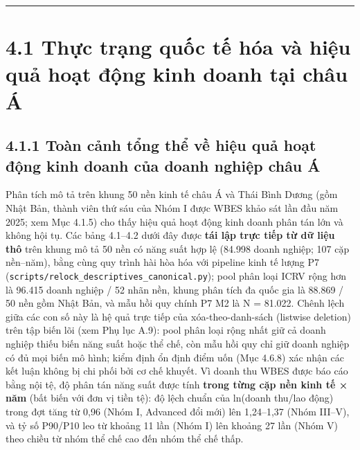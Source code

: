 \documentclass[
  a4paper,
  13pt]{extreport}
\begin{document}
\begin{center}\rule{0.5\linewidth}{0.5pt}\end{center}

\hypertarget{thux1ef1c-trux1ea1ng-quux1ed1c-tux1ebf-huxf3a-vuxe0-hiux1ec7u-quux1ea3-houx1ea1t-ux111ux1ed9ng-kinh-doanh-tux1ea1i-chuxe2u-uxe1}{%
\section{4.1 Thực trạng quốc tế hóa và hiệu quả hoạt động kinh doanh tại
châu
Á}\label{thux1ef1c-trux1ea1ng-quux1ed1c-tux1ebf-huxf3a-vuxe0-hiux1ec7u-quux1ea3-houx1ea1t-ux111ux1ed9ng-kinh-doanh-tux1ea1i-chuxe2u-uxe1}}

\hypertarget{touxe0n-cux1ea3nh-tux1ed5ng-thux1ec3-vux1ec1-hiux1ec7u-quux1ea3-houx1ea1t-ux111ux1ed9ng-kinh-doanh-cux1ee7a-doanh-nghiux1ec7p-chuxe2u-uxe1}{%
\subsection{4.1.1 Toàn cảnh tổng thể về hiệu quả hoạt động kinh doanh
của doanh nghiệp châu
Á}\label{touxe0n-cux1ea3nh-tux1ed5ng-thux1ec3-vux1ec1-hiux1ec7u-quux1ea3-houx1ea1t-ux111ux1ed9ng-kinh-doanh-cux1ee7a-doanh-nghiux1ec7p-chuxe2u-uxe1}}

Phân tích mô tả trên khung 50 nền kinh tế châu Á và Thái Bình Dương (gồm
Nhật Bản, thành viên thứ sáu của Nhóm I được WBES khảo sát lần đầu năm
2025; xem Mục 4.1.5) cho thấy hiệu quả hoạt động kinh doanh phân tán lớn
và không hội tụ. Các bảng 4.1--4.2 dưới đây được \textbf{tái lập trực
tiếp từ dữ liệu thô} trên khung mô tả 50 nền có năng suất hợp lệ (84.998
doanh nghiệp; 107 cặp nền--năm), bằng cùng quy trình hài hòa hóa với
pipeline kinh tế lượng P7
(\texttt{scripts/relock\_descriptives\_canonical.py}); pool phân loại
ICRV rộng hơn là 96.415 doanh nghiệp / 52 nhãn nền, khung phân tích đa
quốc gia là 88.869 / 50 nền gồm Nhật Bản, và mẫu hồi quy chính P7 M2 là
N = 81.022. Chênh lệch giữa các con số này là hệ quả trực tiếp của
xóa-theo-danh-sách (listwise deletion) trên tập biến lõi (xem Phụ lục
A.9): pool phân loại rộng nhất giữ cả doanh nghiệp thiếu biến năng suất
hoặc thể chế, còn mẫu hồi quy chỉ giữ doanh nghiệp có đủ mọi biến mô
hình; kiểm định ổn định điểm uốn (Mục 4.6.8) xác nhận các kết luận không
bị chi phối bởi cơ chế khuyết. Vì doanh thu WBES được báo cáo bằng nội
tệ, độ phân tán năng suất được tính \textbf{trong từng cặp nền kinh tế ×
năm} (bất biến với đơn vị tiền tệ): độ lệch chuẩn của ln(doanh thu/lao
động) trong đợt tăng từ 0,96 (Nhóm I, Advanced đổi mới) lên 1,24--1,37
(Nhóm III--V), và tỷ số P90/P10 leo từ khoảng 11 lần (Nhóm I) lên khoảng
27 lần (Nhóm V) theo chiều từ nhóm thể chế cao đến nhóm thể chế thấp.
\end{document}
